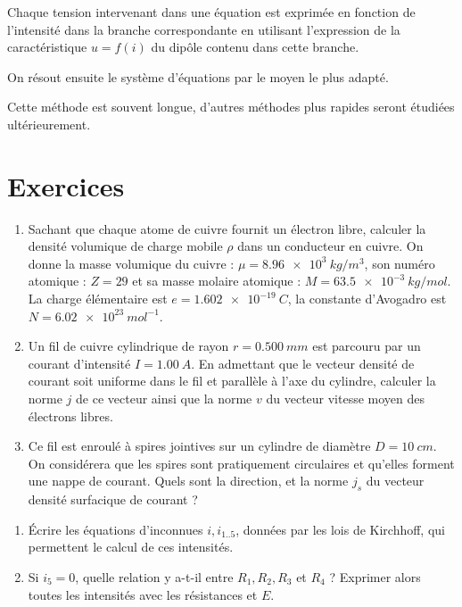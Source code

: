 Chaque tension intervenant dans une équation est exprimée en fonction de l'intensité dans la branche correspondante en utilisant l'expression de la caractéristique $u = f(i)$ du dipôle contenu dans cette branche.

On résout ensuite le système d'équations par le moyen le plus adapté.

Cette méthode est souvent longue, d'autres méthodes plus rapides seront étudiées ultérieurement.

\section{Exercices}
\label{chap9-sec:exercices}

\begin{exercice}
  \begin{enumerate}
  \item Sachant que chaque atome de cuivre fournit un électron libre, calculer la densité volumique de charge mobile $\rho$ dans un conducteur en cuivre. On donne la masse volumique du cuivre : $\mu = \SI{8,96e3}{kg/m^3}$, son numéro atomique : $Z = 29$ et sa masse molaire atomique : $M = \SI{63,5e-3}{kg/mol}$. La charge élémentaire est $e = \SI{1,602e-19}{C}$, la constante d'Avogadro est $N  = \SI{6,02e23}{mol^{-1}}$.
  \item Un fil de cuivre cylindrique de rayon $r = \SI{0,500}{mm}$ est parcouru par un courant d'intensité  $I = \SI{1,00}{A}$. En admettant que le vecteur densité de courant soit uniforme dans le fil et parallèle à l'axe du cylindre, calculer la norme $j$ de ce vecteur ainsi que la norme $v$ du vecteur vitesse moyen des électrons libres.
  \item Ce fil est enroulé à spires jointives sur un cylindre de diamètre $D = \SI{10}{cm}$. On considérera que les spires sont pratiquement circulaires et qu'elles forment une nappe de courant. Quels sont la direction, et la norme $j_s$ du vecteur densité surfacique de courant ?
  \end{enumerate}
\end{exercice}
\begin{exercice}
  \begin{enumerate}
  \item Écrire les équations d'inconnues $i, i_{1 .. 5}$, données par les lois de Kirchhoff, qui permettent le calcul de ces intensités.
  \item Si $i_5 = 0$, quelle relation y a-t-il entre $R_1, R_2, R_3$ et $R_4$ ? Exprimer alors toutes les intensités avec les résistances et $E$.
  \end{enumerate}
\end{exercice}
